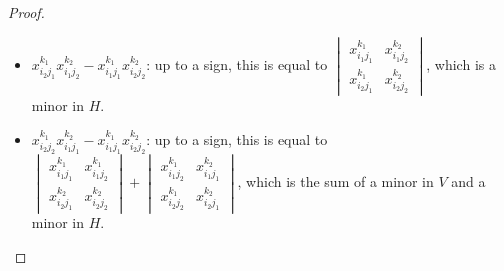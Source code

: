 \documentclass[10pt,a4paper]{amsart}
\begin{document}
\begin{proof}
\begin{enumerate}
\begin{itemize}
        \item $x_{i_2j_1}^{k_1}x_{i_1j_2}^{k_2}-x_{i_1j_1}^{k_1}x_{i_2j_2}^{k_2}$: up to a sign, this is equal to $\begin{vmatrix}
    x_{i_1j_1}^{k_1} & x_{i_1j_2}^{k_2} \\[1ex]
     x_{i_2j_1}^{k_1}   &x_{i_2j_2}^{k_2}
    \end{vmatrix}$,  which is a minor in $H$.
        \item $x_{i_2j_2}^{k_1}x_{i_1j_1}^{k_2}-x_{i_1j_1}^{k_1}x_{i_2j_2}^{k_2}$: up to a sign, this is equal to
 $\begin{vmatrix}
    x_{i_1j_1}^{k_1} & x_{i_1j_2}^{k_1} \\[1ex]
     x_{i_2j_1}^{k_2}   &x_{i_2j_2}^{k_2}
    \end{vmatrix}+\begin{vmatrix}
    x_{i_1j_2}^{k_1} & x_{i_1j_1}^{k_2} \\[1ex]
     x_{i_2j_2}^{k_1}   &x_{i_2j_1}^{k_2}
    \end{vmatrix}$, which is the sum of a minor in $V$ and a minor in $H$.
    \end{itemize}       
   \end{enumerate}
  \end{proof}
\end{document}
